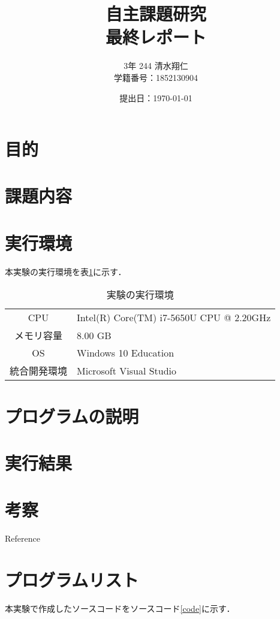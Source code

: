 \documentclass[a4j]{jarticle}
\title {自主課題研究\\最終レポート\\}
\author {3年 244 清水翔仁 \\学籍番号：1852130904}
\date{\西暦 提出日：\today}
\begin{document}
  \maketitle
  \thispagestyle{empty}
  \newpage
  \setcounter{page}{1}
  \pagestyle{plain}

\section{目的}

\section{課題内容} 

\section{実行環境}
  本実験の実行環境を表\ref{tab_env}に示す．
  \begin{table}[htbp]
    \centering 
    \caption{実験の実行環境}
    \label{tab_env}
      \begin{tabular}{c|l}
        \toprule
        CPU & Intel(R) Core(TM) i7-5650U CPU @ 2.20GHz \\
        メモリ容量 & 8.00 GB \\
        OS & Windows 10 Education \\
        統合開発環境 & Microsoft Visual Studio \\
        \bottomrule
      \end{tabular}
  \end{table}

\section{プログラムの説明}

\section{実行結果}\label{result}

\section{考察}

\begin{thebibliography}{9}
   Reference
\end{thebibliography}

\appendix
\def\thesection{付録\Alph{section}}\section{プログラムリスト}\label{appendix}
  本実験で作成したソースコードをソースコード\ref{code}に示す．

\begin{lstlisting}[label = code, caption = CaptionTitle]

\end{lstlisting}
\end{document}
